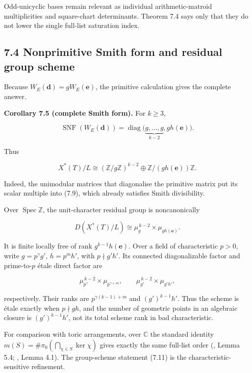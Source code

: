 \documentclass[
  11pt,
  a4paper,
]{article}
\begin{document}
Odd-unicyclic bases remain relevant as individual arithmetic-matroid
multiplicities and square-chart determinants. Theorem 7.4 says only that
they do not lower the single full-list saturation index.

\subsection{7.4 Nonprimitive Smith form and residual group
scheme}\label{nonprimitive-smith-form-and-residual-group-scheme}

Because \(W_E(\mathbf d)=gW_E(\mathbf e)\), the primitive calculation
gives the complete answer.

\textbf{Corollary 7.5 (complete Smith form).} For \(k\ge3\),

\[
 \boxed{
 \operatorname{SNF}(W_E(\mathbf d))
 =\operatorname{diag}
 \bigl(\underbrace{g,\ldots,g}_{k-2},g h(\mathbf e)\bigr).
 }
\tag{7.9}
\]

Thus

\[
 X^*(T)/L
 \cong(\mathbb Z/g\mathbb Z)^{k-2}
 \oplus\mathbb Z/(g h(\mathbf e))\mathbb Z.
\tag{7.10}
\]

Indeed, the unimodular matrices that diagonalise the primitive matrix
put its scalar multiple into (7.9), which already satisfies Smith
divisibility.

Over \(\operatorname{Spec}\mathbb Z\), the unit-character residual group
is noncanonically

\[
 \boxed{
 D(X^*(T)/L)\cong
 \mu_g^{\,k-2}\times\mu_{g h(\mathbf e)}.
 }
\tag{7.11}
\]

It is finite locally free of rank \(g^{k-1}h(\mathbf e)\). Over a field
of characteristic \(p>0\), write \(g=p^\gamma g'\), \(h=p^m h'\), with
\(p\nmid g'h'\). Its connected diagonalizable factor and prime-to-\(p\)
étale direct factor are

\[
 \mu_{p^\gamma}^{\,k-2}\times\mu_{p^{\gamma+m}},
 \qquad
 \mu_{g'}^{\,k-2}\times\mu_{g'h'},
\tag{7.12}
\]

respectively. Their ranks are \(p^{\gamma(k-1)+m}\) and
\((g')^{k-1}h'\). Thus the scheme is étale exactly when \(p\nmid gh\),
and the number of geometric points in an algebraic closure is
\((g')^{k-1}h'\), not its total scheme rank in bad characteristic.

For comparison with toric arrangements, over \(\mathbb C\) the standard
identity \(m(S)=\#\pi_0(\bigcap_{\chi\in S}\ker\chi)\) gives exactly the
same full-list order (, Lemma 5.4;
, Lemma 4.1).
The group-scheme statement (7.11) is the characteristic-sensitive
refinement.
\end{document}

